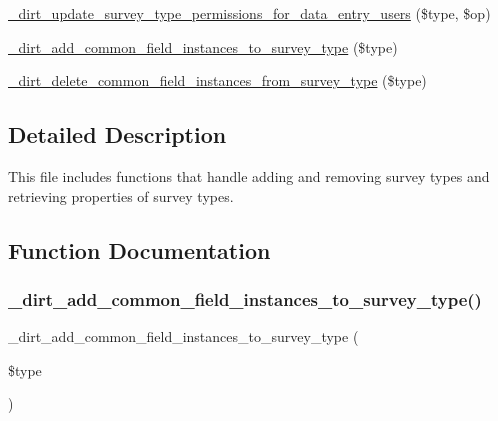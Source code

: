 \begin{DoxyCompactItemize}
\item 
\mbox{\hyperlink{dirt_8survey__types_8inc_acb68757378550b5add8063d43eaef0bd}{\+\_\+dirt\+\_\+update\+\_\+survey\+\_\+type\+\_\+permissions\+\_\+for\+\_\+data\+\_\+entry\+\_\+users}} (\$type, \$op)
\item 
\mbox{\hyperlink{dirt_8survey__types_8inc_a0d11889da2902c97b3569f20acb0b4b9}{\+\_\+dirt\+\_\+add\+\_\+common\+\_\+field\+\_\+instances\+\_\+to\+\_\+survey\+\_\+type}} (\$type)
\item 
\mbox{\hyperlink{dirt_8survey__types_8inc_aca139cdf3507c1c7b4b67d21530518d5}{\+\_\+dirt\+\_\+delete\+\_\+common\+\_\+field\+\_\+instances\+\_\+from\+\_\+survey\+\_\+type}} (\$type)
\end{DoxyCompactItemize}


\subsection{Detailed Description}
This file includes functions that handle adding and removing survey types and retrieving properties of survey types. 

\subsection{Function Documentation}
\mbox{\label{dirt_8survey__types_8inc_a0d11889da2902c97b3569f20acb0b4b9}} 
\subsubsection{\texorpdfstring{\+\_\+dirt\+\_\+add\+\_\+common\+\_\+field\+\_\+instances\+\_\+to\+\_\+survey\+\_\+type()}{\_dirt\_add\_common\_field\_instances\_to\_survey\_type()}}
{\footnotesize\ttfamily \+\_\+dirt\+\_\+add\+\_\+common\+\_\+field\+\_\+instances\+\_\+to\+\_\+survey\+\_\+type (\begin{DoxyParamCaption}\item[{}]{\$type }\end{DoxyParamCaption})}

